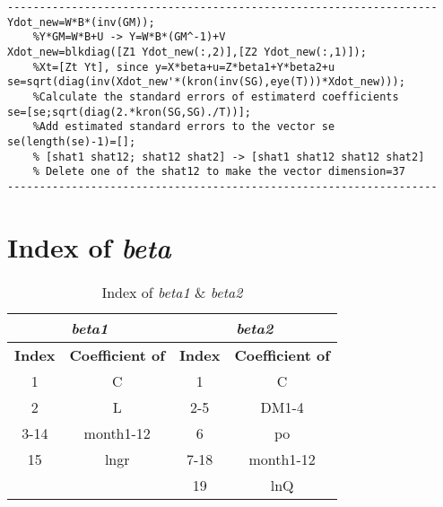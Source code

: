 \documentclass[12pt]{article}
\begin{document}
\lstset{language=Matlab} 
\begin{lstlisting}
-------------------------------------------------------------------
Ydot_new=W*B*(inv(GM)); 
	%Y*GM=W*B+U -> Y=W*B*(GM^-1)+V
Xdot_new=blkdiag([Z1 Ydot_new(:,2)],[Z2 Ydot_new(:,1)]); 
	%Xt=[Zt Yt], since y=X*beta+u=Z*beta1+Y*beta2+u
se=sqrt(diag(inv(Xdot_new'*(kron(inv(SG),eye(T)))*Xdot_new))); 
	%Calculate the standard errors of estimaterd coefficients
se=[se;sqrt(diag(2.*kron(SG,SG)./T))]; 
	%Add estimated standard errors to the vector se
se(length(se)-1)=[];  
	% [shat1 shat12; shat12 shat2] -> [shat1 shat12 shat12 shat2]
	% Delete one of the shat12 to make the vector dimension=37
-------------------------------------------------------------------
\end{lstlisting}

\newpage
\section{Index of \textit{beta}}
\begin{table}[h]
\centering
\caption{Index of \textit{beta1} \& \textit{beta2}}
\vspace{3mm}
\begin{tabular}{c|c|c|c}
\hline
\multicolumn{2}{c|}{\textbf{\textit{beta1}}} & \multicolumn{2}{|c}{\textbf{\textit{beta2}}} \\ \hline
\textbf{Index}   & \textbf{Coefficient of}  & \textbf{Index}   & \textbf{Coefficient of}    \\ \hline
1       & C               & 1       & C                 \\
2       & L               & 2-5     & DM1-4             \\
3-14    & month1-12       & 6       & po                \\
15      & lngr            & 7-18    & month1-12         \\
        &                 & 19      & lnQ               \\ \hline
\end{tabular}
\end{table}
\end{document}
